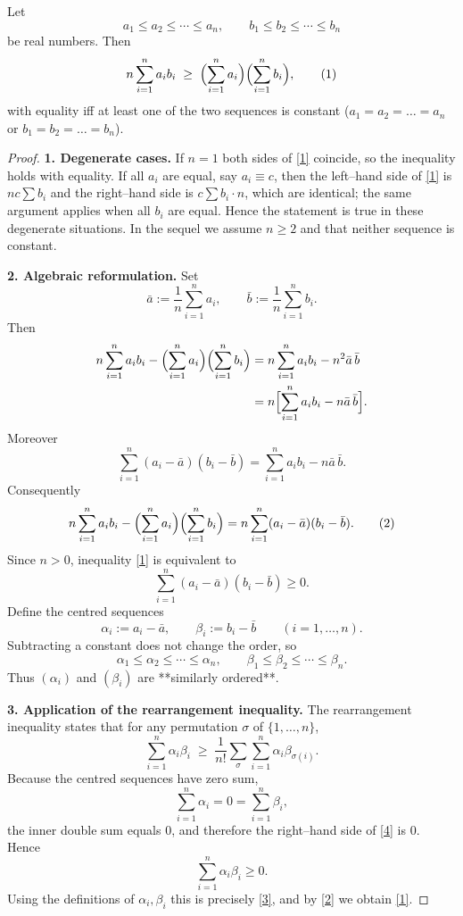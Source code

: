 \begin{theorem}
Let  
\[
a_{1}\le a_{2}\le\cdots\le a_{n},\qquad 
b_{1}\le b_{2}\le\cdots\le b_{n}
\]
be real numbers. Then  
\[
n\sum_{i=1}^{n}a_i b_i\;\ge\;
\Bigl(\sum_{i=1}^{n}a_i\Bigr)
\Bigl(\sum_{i=1}^{n}b_i\Bigr),
\tag{1}
\]
with equality iff at least one of the two sequences is constant
($a_{1}=a_{2}= \dots =a_{n}$ or $b_{1}=b_{2}= \dots =b_{n}$).
\end{theorem}

\begin{proof}
\textbf{1. Degenerate cases.}  
If $n=1$ both sides of \eqref{1} coincide, so the inequality holds with equality.  
If all $a_i$ are equal, say $a_i\equiv c$, then the left–hand side of \eqref{1} is $nc\sum b_i$ and the right–hand side is $c\sum b_i\cdot n$, which are identical; the same argument applies when all $b_i$ are equal. Hence the statement is true in these degenerate situations.  
In the sequel we assume $n\ge2$ and that neither sequence is constant.

\medskip\noindent\textbf{2. Algebraic reformulation.}  
Set  
\[
\bar a:=\frac1n\sum_{i=1}^{n}a_i,\qquad 
\bar b:=\frac1n\sum_{i=1}^{n}b_i .
\]
Then
\begin{align*}
n\sum_{i=1}^{n}a_i b_i-\Bigl(\sum_{i=1}^{n}a_i\Bigr)\Bigl(\sum_{i=1}^{n}b_i\Bigr)
&=n\sum_{i=1}^{n}a_i b_i-n^{2}\bar a\,\bar b   \\
&=n\Bigl[\sum_{i=1}^{n}a_i b_i-n\bar a\,\bar b\Bigr].
\end{align*}
Moreover
\[
\sum_{i=1}^{n}(a_i-\bar a)(b_i-\bar b)
   =\sum_{i=1}^{n}a_i b_i-n\bar a\,\bar b .
\]
Consequently
\begin{equation}
n\sum_{i=1}^{n}a_i b_i-\Bigl(\sum_{i=1}^{n}a_i\Bigr)\Bigl(\sum_{i=1}^{n}b_i\Bigr)
   =n\sum_{i=1}^{n}(a_i-\bar a)(b_i-\bar b).
\tag{2}
\end{equation}
Since $n>0$, inequality \eqref{1} is equivalent to
\begin{equation}
\sum_{i=1}^{n}(a_i-\bar a)(b_i-\bar b)\ge0 .
\tag{3}
\end{equation}
Define the centred sequences
\[
\alpha_i:=a_i-\bar a,\qquad \beta_i:=b_i-\bar b\qquad(i=1,\dots ,n).
\]
Subtracting a constant does not change the order, so
\[
\alpha_1\le\alpha_2\le\cdots\le\alpha_n,\qquad 
\beta_1\le\beta_2\le\cdots\le\beta_n .
\]
Thus $(\alpha_i)$ and $(\beta_i)$ are **similarly ordered**.

\medskip\noindent\textbf{3. Application of the rearrangement inequality.}  
The rearrangement inequality states that for any permutation $\sigma$ of $\{1,\dots ,n\}$,
\begin{equation}
\sum_{i=1}^{n}\alpha_i\beta_i
   \;\ge\;\frac1{n!}\sum_{\sigma}\sum_{i=1}^{n}\alpha_i\beta_{\sigma(i)} .
\tag{4}
\end{equation}
Because the centred sequences have zero sum,
\[
\sum_{i=1}^{n}\alpha_i=0=\sum_{i=1}^{n}\beta_i,
\]
the inner double sum equals $0$, and therefore the right–hand side of \eqref{4} is $0$. Hence
\[
\sum_{i=1}^{n}\alpha_i\beta_i\ge0 .
\]
Using the definitions of $\alpha_i,\beta_i$ this is precisely \eqref{3}, and by \eqref{2} we obtain \eqref{1}.


\end{proof}
